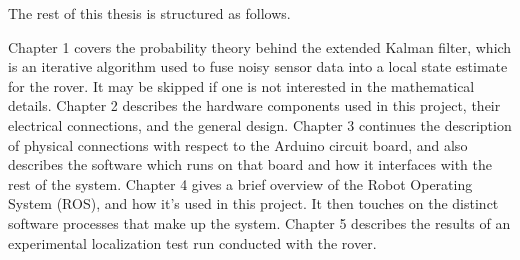 The rest of this thesis is structured as follows.

Chapter 1 covers the probability theory behind the extended Kalman filter, which is an iterative algorithm used to fuse noisy sensor data into a local state estimate for the rover. It may be skipped if one is not interested in the mathematical details. Chapter 2 describes the hardware components used in this project, their electrical connections, and the general design. Chapter 3 continues the description of physical connections with respect to the Arduino circuit board, and also describes the software which runs on that board and how it interfaces with the rest of the system. Chapter 4 gives a brief overview of the Robot Operating System (ROS), and how it's used in this project. It then touches on the distinct software processes that make up the system. Chapter 5 describes the results of an experimental localization test run conducted with the rover.

